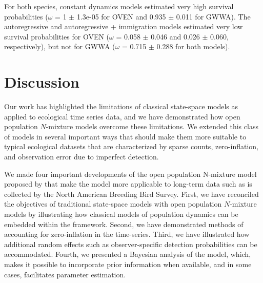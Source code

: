 \documentclass[12pt]{article}
\begin{document}
For both species, constant dynamics models estimated very high
survival probabilities ($\omega$ = 1 $\pm$ 1.3e-05 for OVEN and 0.935 $\pm$ 0.011 for
GWWA).   The autoregressive and autoregressive + immigration models
estimated very low survival probabilities for OVEN ($\omega$ = 0.058 $\pm$ 0.046
and 0.026 $\pm$ 0.060, respectively), but not for GWWA ($\omega$ = 0.715 $\pm$ 0.288
for both models).




\section{Discussion}

Our work has highlighted the limitations of classical state-space
models as applied to ecological time series data, and we have
demonstrated how open population $N$-mixture models overcome these
limitations. We extended this class of models in several important
ways that should make them more suitable to typical ecological
datasets that are characterized by sparse counts, zero-inflation, and
observation error due to imperfect detection.

We made four important developments of the open population
N-mixture model proposed by \citep{dail_madsen:2011} that make the
model more applicable to long-term data such as is collected
by the North American Breeding Bird Survey. First, we have
reconciled the objectives of traditional state-space models
with open population $N$-mixture models by illustrating how
classical models of population dynamics can be embedded within
the framework. Second, we have demonstrated methods of
accounting for zero-inflation in the time-series. Third, we
have illustrated how additional random effects such as
observer-specific detection probabilities can be
accommodated. Fourth, we presented a Bayesian analysis of the
model, which, makes it possible to incorporate prior information when
available, and in some cases, facilitates parameter estimation.
\end{document}
